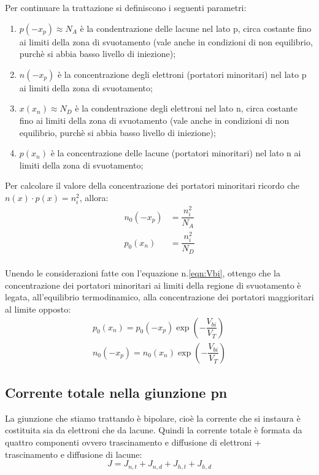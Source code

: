 Per continuare la trattazione si definiscono i seguenti parametri:
 \begin{enumerate}
     \item $p(-x_p) \approx N_A$ è la condentrazione delle lacune nel lato p, circa costante fino ai limiti della zona di svuotamento (vale anche in condizioni di non equilibrio, purchè si abbia basso livello di iniezione);
     \item $n(-x_p)$ è la concentrazione degli elettroni (portatori minoritari) nel lato p ai limiti della zona di svuotamento;
     \item $x(x_n) \approx N_D$ è la condentrazione degli elettroni nel lato n, circa costante fino ai limiti della zona di svuotamento (vale anche in condizioni di non equilibrio, purchè si abbia basso livello di iniezione);
     \item $p(x_n)$ è la concentrazione delle lacune (portatori minoritari) nel lato n ai limiti della zona di svuotamento;
 \end{enumerate}
Per calcolare il valore della concentrazione dei portatori minoritari ricordo che $n(x) \cdot p(x) =n_i^2$, allora:
 \begin{align*}
     n_0(-x_p) &= \dfrac{n_i^2}{N_A}\\
     p_0(x_n)  &= \dfrac{n_i^2}{N_D}
 \end{align*}\\
 Unendo le considerazioni fatte con l'equazione n.\ref{eqn:Vbi}, ottengo che la concentrazione dei portatori minoritari ai limiti della regione di svuotamento è legata, all'equilibrio termodinamico, alla concentrazione dei portatori maggioritari al limite opposto:
 \begin{align}
     p_0(x_n)=p_0(-x_p) \exp \left( -\dfrac{V_{bi}}{V_T} \right)\\
     n_0(-x_p)=n_0(x_n) \exp \left( -\dfrac{V_{bi}}{V_T} \right)
 \end{align}

\cleardoublepage%
\subsection{Corrente totale nella giunzione pn}
La giunzione che stiamo trattando è bipolare, cioè la corrente che si instaura è costituita sia da elettroni che da lacune. Quindi la corrente totale è formata da quattro componenti ovvero trascinamento e diffusione di elettroni + trascinamento e diffusione di lacune:
\begin{equation}
    J = J_{n,t} + J_{n,d} + J_{h,t} + J_{h,d}
\end{equation}

